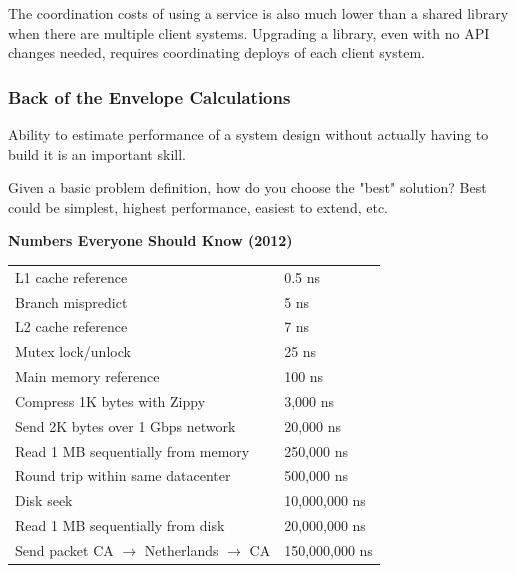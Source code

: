 \documentclass{article}
\begin{document}
    The coordination costs of using a service is also much lower than a shared library when there are multiple client systems. Upgrading a library, even with no API changes needed, requires coordinating deploys of each client system.

    \subsubsection{Back of the Envelope Calculations}
    Ability to estimate performance of a system design without actually having to build it is an important skill.
    
    Given a basic problem definition, how do you choose the "best" solution? Best could be simplest, highest performance, easiest to extend, etc.
    
    \textbf{Numbers Everyone Should Know (2012)}
    \begin{table}[H]
    \begin{tabular}{|l|l|}
    \hline
        L1 cache reference & 0.5 ns  \\
        Branch mispredict &  5 ns \\
        L2 cache reference & 7 ns \\
        Mutex lock/unlock & 25 ns \\
        Main memory reference & 100 ns \\
        Compress 1K bytes with Zippy & 3,000 ns \\
        Send 2K bytes over 1 Gbps network & 20,000 ns \\
        Read 1 MB sequentially from memory & 250,000 ns \\
        Round trip within same datacenter & 500,000 ns \\
        Disk seek & 10,000,000 ns \\
        Read 1 MB sequentially from disk & 20,000,000 ns \\
        Send packet CA $\to$ Netherlands $\to$ CA & 150,000,000 ns \\
    \hline
    \end{tabular}
    \end{table}
    
\end{document}
